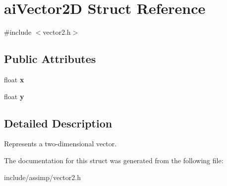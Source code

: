 \hypertarget{structaiVector2D}{\section{ai\-Vector2\-D \-Struct \-Reference}
\label{structaiVector2D}
}


{\ttfamily \#include $<$vector2.\-h$>$}

\subsection*{\-Public \-Attributes}
\begin{DoxyCompactItemize}
\item 
\hypertarget{structaiVector2D_a968e4db235e054f58b4c320576d82740}{float {\bfseries x}}\label{structaiVector2D_a968e4db235e054f58b4c320576d82740}

\item 
\hypertarget{structaiVector2D_a7bb1686f941459496627a3b8ce68e73f}{float {\bfseries y}}\label{structaiVector2D_a7bb1686f941459496627a3b8ce68e73f}

\end{DoxyCompactItemize}


\subsection{\-Detailed \-Description}
\-Represents a two-\/dimensional vector. 

\-The documentation for this struct was generated from the following file\-:\begin{DoxyCompactItemize}
\item 
include/assimp/vector2.\-h\end{DoxyCompactItemize}
